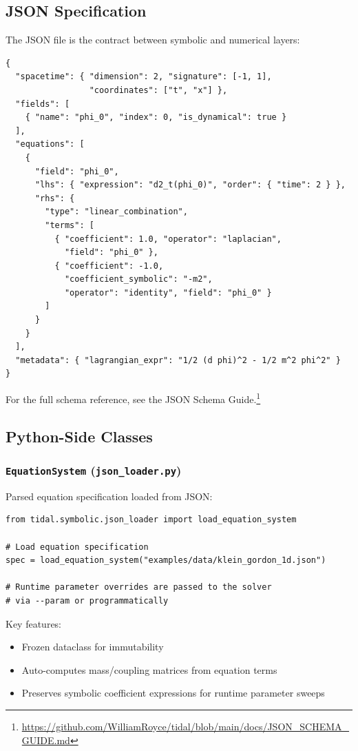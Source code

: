 \subsection{JSON Specification}

The JSON file is the contract between symbolic and numerical layers:

\begin{lstlisting}[style=json]
{
  "spacetime": { "dimension": 2, "signature": [-1, 1],
                 "coordinates": ["t", "x"] },
  "fields": [
    { "name": "phi_0", "index": 0, "is_dynamical": true }
  ],
  "equations": [
    {
      "field": "phi_0",
      "lhs": { "expression": "d2_t(phi_0)", "order": { "time": 2 } },
      "rhs": {
        "type": "linear_combination",
        "terms": [
          { "coefficient": 1.0, "operator": "laplacian",
            "field": "phi_0" },
          { "coefficient": -1.0,
            "coefficient_symbolic": "-m2",
            "operator": "identity", "field": "phi_0" }
        ]
      }
    }
  ],
  "metadata": { "lagrangian_expr": "1/2 (d phi)^2 - 1/2 m^2 phi^2" }
}
\end{lstlisting}

For the full schema reference, see the JSON Schema Guide.\footnote{\url{https://github.com/WilliamRoyce/tidal/blob/main/docs/JSON\_SCHEMA\_GUIDE.md}}

\subsection{Python-Side Classes}

\subsubsection{\texttt{EquationSystem} (\texttt{json\_loader.py})}

Parsed equation specification loaded from JSON:

\begin{lstlisting}[style=python]
from tidal.symbolic.json_loader import load_equation_system

# Load equation specification
spec = load_equation_system("examples/data/klein_gordon_1d.json")

# Runtime parameter overrides are passed to the solver
# via --param or programmatically
\end{lstlisting}

Key features:
\begin{itemize}
  \item Frozen dataclass for immutability
  \item Auto-computes mass/coupling matrices from equation terms
  \item Preserves symbolic coefficient expressions for runtime parameter sweeps
\end{itemize}

